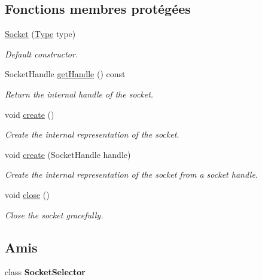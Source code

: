 \subsection*{Fonctions membres protégées}
\begin{DoxyCompactItemize}
\item 
\hyperlink{classsf_1_1Socket_a80ffb47ec0bafc83af019055d3e6a303}{Socket} (\hyperlink{classsf_1_1Socket_a5d3ff44e56e68f02816bb0fabc34adf8}{Type} type)
\begin{DoxyCompactList}\small\item\em Default constructor. \end{DoxyCompactList}\item 
Socket\+Handle \hyperlink{classsf_1_1Socket_a675457784284ae2f5640bbbe16729393}{get\+Handle} () const
\begin{DoxyCompactList}\small\item\em Return the internal handle of the socket. \end{DoxyCompactList}\item 
void \hyperlink{classsf_1_1Socket_aafbe140f4b1921e0d19e88cf7a61dcbc}{create} ()
\begin{DoxyCompactList}\small\item\em Create the internal representation of the socket. \end{DoxyCompactList}\item 
void \hyperlink{classsf_1_1Socket_af1dd898f7aa3ead7ff7b2d1c20e97781}{create} (Socket\+Handle handle)
\begin{DoxyCompactList}\small\item\em Create the internal representation of the socket from a socket handle. \end{DoxyCompactList}\item 
void \hyperlink{classsf_1_1Socket_a71f2f5c2aa99e01cafe824fee4c573be}{close} ()
\begin{DoxyCompactList}\small\item\em Close the socket gracefully. \end{DoxyCompactList}\end{DoxyCompactItemize}
\subsection*{Amis}
\begin{DoxyCompactItemize}
\item 
\mbox{\label{classsf_1_1Socket_a23fafd48278ea4f8f9c25f1f0f43693c}} 
class {\bfseries Socket\+Selector}
\end{DoxyCompactItemize}


